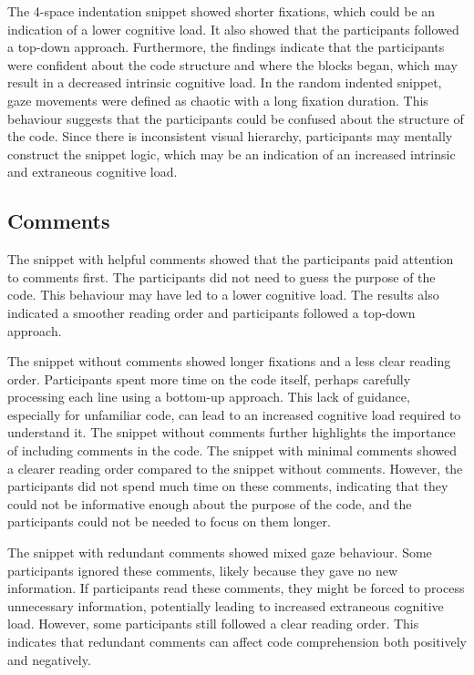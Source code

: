 The 4-space indentation snippet showed shorter fixations, which could be an indication of a lower cognitive load. It also showed that the participants followed a top-down approach. Furthermore, the findings indicate that the participants were confident about the code structure and where the blocks began, which may result in a decreased intrinsic cognitive load.      
In the random indented snippet, gaze movements were defined as chaotic with a long fixation duration. This behaviour suggests that the participants could be confused about the structure of the code. Since there is inconsistent visual hierarchy, participants may mentally construct the snippet logic, which may be an indication of an increased intrinsic and extraneous cognitive load.    

\subsection{Comments} 
The snippet with helpful comments showed that the participants paid attention to comments first. The participants did not need to guess the purpose of the code. This behaviour may have led to a lower cognitive load.  The results also indicated a smoother reading order and  participants followed a top-down approach.


The snippet without comments showed longer fixations and a less clear reading order.  Participants spent more time on the code itself, perhaps carefully processing each line using a bottom-up approach. This lack of guidance, especially for unfamiliar code, can lead to an increased cognitive load required to understand it.  The snippet without comments further highlights the importance of including comments in the code. The snippet with minimal comments showed a clearer reading order compared to the snippet without comments. However, the participants did not spend much time on these comments, indicating that they could not be informative enough about the purpose of the code, and the participants could not be needed to focus on them longer.  

The snippet with redundant comments showed mixed gaze behaviour.  Some participants ignored these comments, likely because they gave no new information. If participants read these comments, they might be forced to process unnecessary information, potentially leading to increased extraneous cognitive load.  However, some participants still followed a clear reading order. This indicates that redundant comments can affect code comprehension both positively and negatively.  



